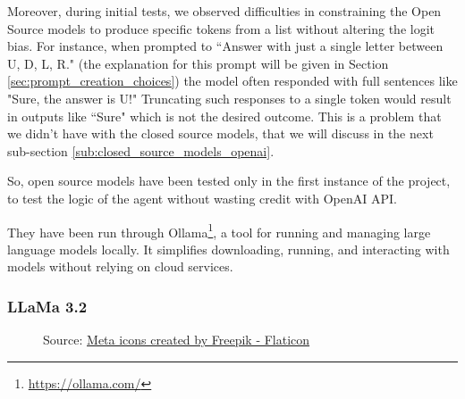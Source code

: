 Moreover, during initial tests, we observed difficulties in constraining the
Open Source models to produce specific tokens from a list without altering the
logit bias. For instance, when prompted to ``Answer with just a single letter
between U, D, L, R." (the explanation for this prompt will be given in Section
\ref{sec:prompt_creation_choices}) the model often responded with full sentences
like "Sure, the answer is U!" Truncating such responses to a single token would result
in outputs like ``Sure" which is not the desired outcome. This is a problem that
we didn't have with the closed source models, that we will discuss in the next
sub-section \ref{sub:closed_source_models_openai}.

So, open source models have been tested only in the first instance of the project,
to test the logic of the agent without wasting credit with OpenAI API.

They have been run through Ollama\footnote{\url{https://ollama.com/}}, a tool
for running and managing large language models locally. It simplifies downloading,
running, and interacting with models without relying on cloud services.

\subsubsection{LLaMa 3.2}
\begin{figure}
  \centering
  \def\stackalignment{l}
  {\scriptsize \parbox[t]{\linewidth}{Source: \href{https://www.flaticon.com/free-icon/meta_6033716}{Meta icons created by Freepik - Flaticon}}}
\end{figure}


